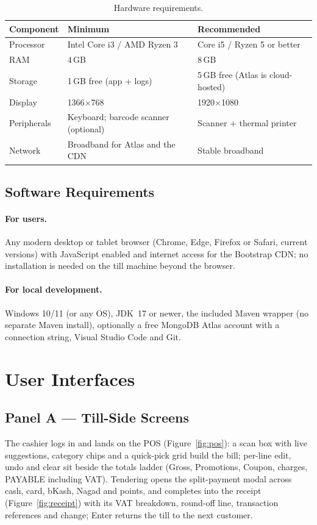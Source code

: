 \documentclass[12pt,a4paper]{report}
\begin{document}
\begin{table}[H]
\centering
\caption{Hardware requirements.}
\label{tab:hw}
\small
\begin{tabularx}{\textwidth}{l X X}
\toprule
\textbf{Component} & \textbf{Minimum} & \textbf{Recommended} \\
\midrule
Processor & Intel Core i3 / AMD Ryzen 3 & Core i5 / Ryzen 5 or better \\
RAM & 4\,GB & 8\,GB \\
Storage & 1\,GB free (app + logs) & 5\,GB free (Atlas is cloud-hosted) \\
Display & 1366$\times$768 & 1920$\times$1080 \\
Peripherals & Keyboard; barcode scanner (optional) & Scanner + thermal printer \\
Network & Broadband for Atlas and the CDN & Stable broadband \\
\bottomrule
\end{tabularx}
\end{table}

\subsection{Software Requirements}
\paragraph{For users.} Any modern desktop or tablet browser (Chrome, Edge, Firefox or
Safari, current versions) with JavaScript enabled and internet access for the Bootstrap
CDN; no installation is needed on the till machine beyond the browser.
\paragraph{For local development.} Windows 10/11 (or any OS), JDK~17 or newer, the
included Maven wrapper (no separate Maven install), optionally a free MongoDB Atlas
account with a connection string, Visual Studio Code and Git.

\section{User Interfaces}

\subsection{Panel A --- Till-Side Screens}
The cashier logs in and lands on the POS (Figure~\ref{fig:pos}): a scan box with live
suggestions, category chips and a quick-pick grid build the bill; per-line edit, undo and
clear sit beside the totals ladder (Gross, Promotions, Coupon, charges, PAYABLE including
VAT). Tendering opens the split-payment modal across cash, card, bKash, Nagad and points,
and completes into the receipt (Figure~\ref{fig:receipt}) with its VAT breakdown, round-off
line, transaction references and change; Enter returns the till to the next customer.
\end{document}

